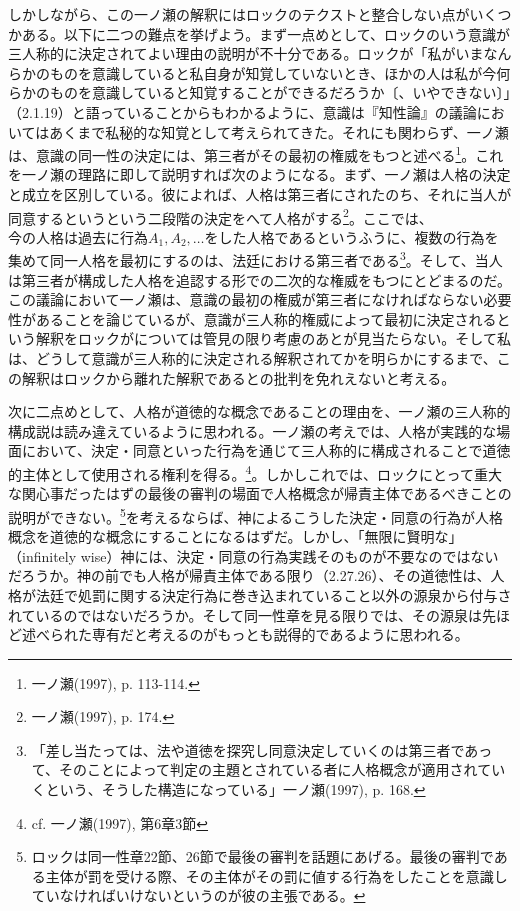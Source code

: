 \documentclass[a4j,oneside]{jsbook}
\begin{document}
しかしながら、この一ノ瀬の解釈にはロックのテクストと整合しない点がいくつかある。以下に二つの難点を挙げよう。まず一点めとして、ロックのいう意識が三人称的に決定されてよい理由の説明が不十分である。ロックが「私がいまなんらかのものを意識していると私自身が知覚していないとき、ほかの人は私が今何らかのものを意識していると知覚することができるだろうか〔、いやできない〕」（2.1.19）と語っていることからもわかるように、意識は『知性論』の議論においてはあくまで私秘的な知覚として考えられてきた。それにも関わらず、一ノ瀬は、意識の同一性の決定には、第三者がその最初の権威をもつと述べる\footnote{一ノ瀬(1997), p. 113-114.}。これを一ノ瀬の理路に即して説明すれば次のようになる。まず、一ノ瀬は人格の決定と成立を区別している。彼によれば、人格は第三者にされたのち、それに当人が同意するというという二段階の決定をへて人格がする\footnote{一ノ瀬(1997), p. 174.}。ここでは、$今の人格は過去に行為A_1, A_2, \ldots をした人格であるというふうに$、複数の行為を集めて同一人格を最初にするのは、法廷における第三者である\footnote{「差し当たっては、法や道徳を探究し同意決定していくのは第三者であって、そのことによって判定の主題とされている者に人格概念が適用されていくという、そうした構造になっている」一ノ瀬(1997), p. 168.}。そして、当人は第三者が構成した人格を追認する形での二次的な権威をもつにとどまるのだ。この議論において一ノ瀬は、意識の最初の権威が第三者になければならない必要性があることを論じているが、意識が三人称的権威によって最初に決定されるという解釈をロックがについては管見の限り考慮のあとが見当たらない。そして私は、どうして意識が三人称的に決定される解釈されてかを明らかにするまで、この解釈はロックから離れた解釈であるとの批判を免れえないと考える。
\par
次に二点めとして、人格が道徳的な概念であることの理由を、一ノ瀬の三人称的構成説は読み違えているように思われる。一ノ瀬の考えでは、人格が実践的な場面において、決定・同意といった行為を通じて三人称的に構成されることで道徳的主体として使用される権利を得る。\footnote{cf. 一ノ瀬(1997), 第6章3節}。しかしこれでは、ロックにとって重大な関心事だったはずの最後の審判の場面で人格概念が帰責主体であるべきことの説明ができない。\footnote{ロックは同一性章22節、26節で最後の審判を話題にあげる。最後の審判である主体が罰を受ける際、その主体がその罰に値する行為をしたことを意識していなければいけないというのが彼の主張である。}を考えるならば、神によるこうした決定・同意の行為が人格概念を道徳的な概念にすることになるはずだ。しかし、「無限に賢明な」（infinitely wise）神には、決定・同意の行為実践そのものが不要なのではないだろうか。神の前でも人格が帰責主体である限り（2.27.26）、その道徳性は、人格が法廷で処罰に関する決定行為に巻き込まれていること以外の源泉から付与されているのではないだろうか。そして同一性章を見る限りでは、その源泉は先ほど述べられた専有だと考えるのがもっとも説得的であるように思われる。
\end{document}
